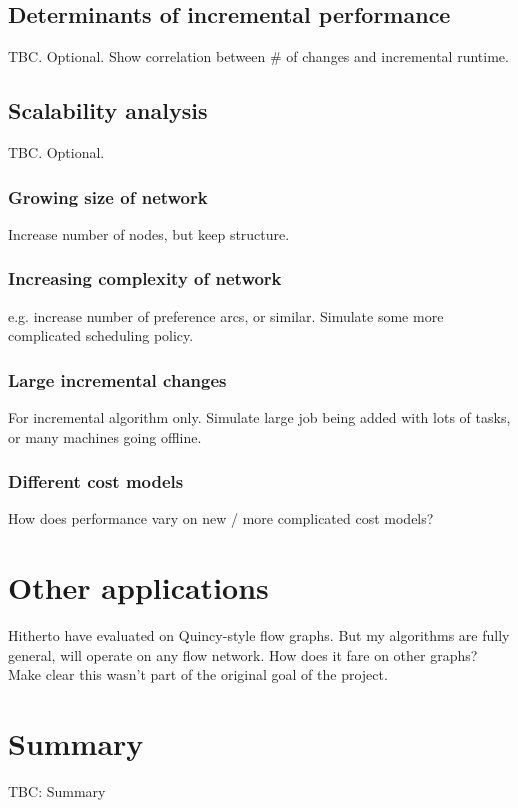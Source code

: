 
\subsection{Determinants of incremental performance}

TBC. Optional. Show correlation between \# of changes and incremental runtime.

\subsection{Scalability analysis}
TBC. Optional.

\subsubsection{Growing size of network}

Increase number of nodes, but keep structure.

\subsubsection{Increasing complexity of network}

e.g. increase number of preference arcs, or similar. Simulate some more complicated scheduling policy.

\subsubsection{Large incremental changes}

For incremental algorithm only. Simulate large job being added with lots of tasks, or many machines going offline.

\subsubsection{Different cost models}

How does performance vary on new / more complicated cost models?

\section{Other applications}

Hitherto have evaluated on Quincy-style flow graphs. But my algorithms are fully general, will operate on any flow network. How does it fare on other graphs? Make clear this wasn't part of the original goal of the project.

\section{Summary}

TBC: Summary